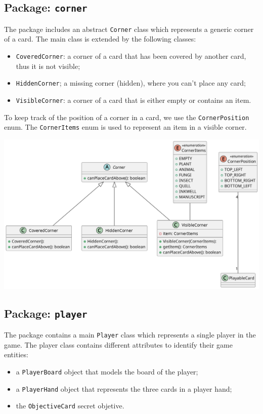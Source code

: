 \documentclass{article}
\begin{document}
\subsection{Package: \texttt{corner}}
The package includes an abstract \texttt{Corner} class which represents a generic corner of a card.
The main class is extended by the following classes:
\begin{itemize}
    \item \texttt{CoveredCorner}: a corner of a card that has been covered by another card, thus it is not visible;
    \item \texttt{HiddenCorner}; a missing corner (hidden), where you can't place any card;
    \item \texttt{VisibleCorner}: a corner of a card that is either empty or contains an item.
\end{itemize}
To keep track of the position of a corner in a card, we use the \texttt{CornerPosition} enum.
\noindent
The \texttt{CornerItems} enum is used to represent an item in a visible corner.
\begin{center}
    \hspace*{-2cm}\includegraphics[scale=0.15]{corner.png}
\end{center}

\newpage
\subsection{Package: \texttt{player}}
The package contains a main \texttt{Player} class which represents a single player in the game.
The player class contains different attributes to identify their game entities:
\begin{itemize}
    \item a \texttt{PlayerBoard} object that models the board of the player;
    \item a \texttt{PlayerHand} object that represents the three cards in a player hand;
    \item the \texttt{ObjectiveCard} secret objetive.
\end{itemize}
\end{document}

